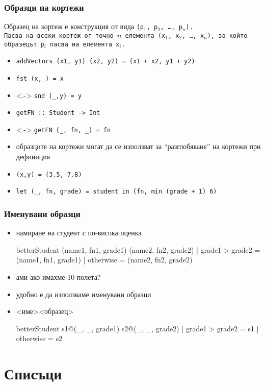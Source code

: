 \documentclass{beamer}
\begin{document}
\begin{frame}[fragile]
  \frametitle{Образци на кортежи}
  Образец на кортеж е конструкция от вида \tt{(p$_1$, p$_2$, \ldots, p$_n$)}.\\\pause
  Пасва на всеки кортеж от точно $n$ елемента \tt{(x$_1$, x$_2$, \ldots, x$_n$)}, за който образецът \tt{p$_i$} пасва на елемента \tt{x$_i$}.
  \onslide<+->
  \begin{itemize}[<+->]
  \item \verb#addVectors (x1, y1) (x2, y2) = (x1 + x2, y1 + y2)#
  \item \verb#fst (x,_) = x#
  \item<.-> \verb#snd (_,y) = y#
  \item \verb#getFN :: Student -> Int#
  \item<.-> \verb#getFN (_, fn, _) = fn#
  \item образците на кортежи могат да се използват за ``разглобяване'' на кортежи при дефиниция
  \item \verb#(x,y) = (3.5, 7.8)#
  \item \verb#let (_, fn, grade) = student in (fn, min (grade + 1) 6)#
  \end{itemize}
\end{frame}

\begin{frame}[fragile]
  \frametitle{Именувани образци}
  \begin{itemize}[<+->]
  \item намиране на студент с по-висока оценка
\begin{semiverbatim}
betterStudent (name1, fn1, grade1) (name2, fn2, grade2)
 | grade1 > grade2 = (name1, fn1, grade1)
 | otherwise       = (name2, fn2, grade2)
\end{semiverbatim}
  \item ами ако имахме 10 полета?
  \item удобно е да използваме \alert{именувани образци}
  \item{} <име>\tta@<образец> \onslide<+->
\begin{semiverbatim}
betterStudent s1@(_, _, grade1) s2@(_, _, grade2)
 | grade1 > grade2 = s1
 | otherwise       = s2
\end{semiverbatim}
  \end{itemize}
\end{frame}

\section{Списъци}
\end{document}

